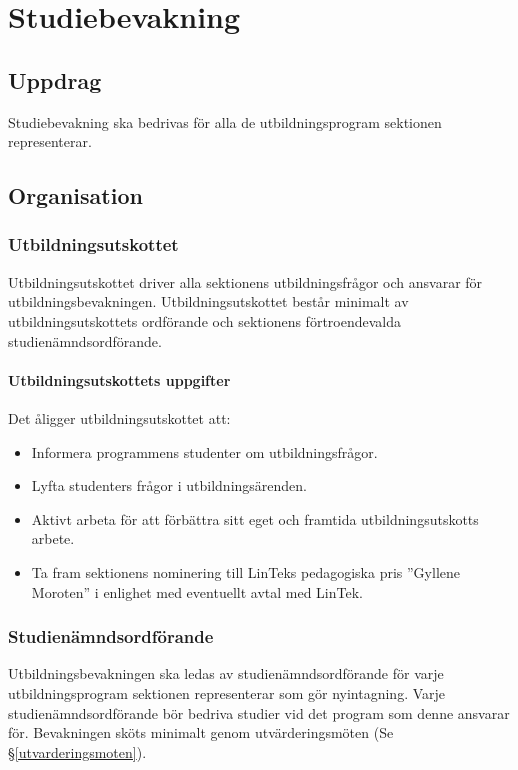 \documentclass{datateknologsektionen-document}
\begin{document}
\section{Studiebevakning}

\subsection{Uppdrag}
Studiebevakning ska bedrivas för alla de utbildningsprogram sektionen representerar.

\subsection{Organisation}

\subsubsection{Utbildningsutskottet}
\label{utbu}
Utbildningsutskottet driver alla sektionens utbildningsfrågor och ansvarar för
utbildningsbevakningen. Utbildningsutskottet består minimalt av utbildningsutskottets
ordförande och sektionens förtroendevalda studienämndsordförande.
\paragraph{Utbildningsutskottets uppgifter}
Det åligger utbildningsutskottet att:
\begin{itemize}
  \item Informera programmens studenter om utbildningsfrågor.
  \item Lyfta studenters frågor i utbildningsärenden.
  \item Aktivt arbeta för att förbättra sitt eget och framtida utbildningsutskotts arbete.
  \item Ta fram sektionens nominering till LinTeks pedagogiska pris ”Gyllene Moroten” i enlighet med eventuellt avtal med LinTek.
\end{itemize}

\subsubsection{Studienämndsordförande}
\label{snordf}
Utbildningsbevakningen ska ledas av studienämndsordförande för varje utbildningsprogram
sektionen representerar som gör nyintagning. Varje studienämndsordförande bör bedriva
studier vid det program som denne ansvarar för. Bevakningen sköts minimalt genom
utvärderingsmöten (Se \S \ref{utvarderingsmoten}).
\end{document}
